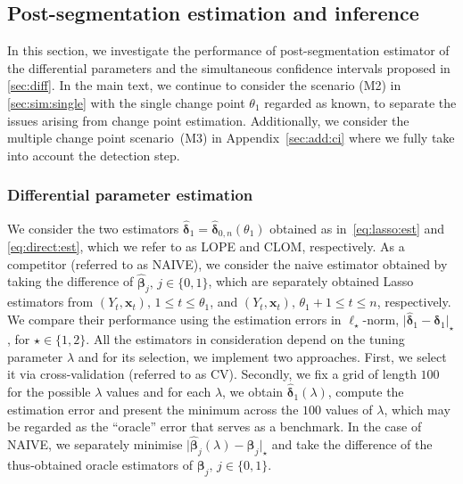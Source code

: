 \documentclass[11pt, a4paper]{article}
\newcommand{\mbf}{\mathbf}
\def\wh{\widehat}
\newcommand{\cp}{\theta}
\theoremstyle{definition}
\theoremstyle{definition}
\theoremstyle{definition}
\theoremstyle{definition}
\theoremstyle{definition}
\theoremstyle{remark}
\theoremstyle{definition}
\theoremstyle{definition}
\theoremstyle{definition}
\begin{document}
\subsection{Post-segmentation estimation and inference}
\label{sec:sim:post}

In this section, we investigate the performance of post-segmentation estimator of the differential parameters and the simultaneous confidence intervals proposed in \cref{sec:diff}.
In the main text, we continue to consider the scenario (M2) in \cref{sec:sim:single} with the single change point $\cp_1$ regarded as known, to separate the issues arising from change point estimation.
Additionally, we consider the multiple change point scenario~(M3) in Appendix~\ref{sec:add:ci} where we fully take into account the detection step.
 
\subsubsection{Differential parameter estimation}
\label{sec:sim:dpe}

We consider the two estimators $\wh{\bm\delta}_1 = \wh{\bm\delta}_{0, n}(\cp_1)$ obtained as in~\eqref{eq:lasso:est} and \eqref{eq:direct:est}, which we refer to as LOPE and CLOM, respectively.
As a competitor (referred to as NAIVE), we consider the naive estimator obtained by taking the difference of $\wh{\bm\beta}_j, \, j \in \{0, 1\}$, which are separately obtained Lasso estimators from $(Y_t, \mbf x_t), \, 1 \le t \le \cp_1$, and $(Y_t, \mbf x_t), \, \cp_1 + 1 \le t \le n$, respectively.
We compare their performance using the estimation errors in $\ell_\star$-norm, $\vert \wh{\bm\delta}_1 - \bm\delta_1 |_\star$, for $\star \in \{1, 2\}$.
All the estimators in consideration depend on the tuning parameter $\lambda$ and for its selection, we implement two approaches.
First, we select it via cross-validation (referred to as CV).
Secondly, we fix a grid of length $100$ for the possible $\lambda$ values and for each $\lambda$, we obtain $\wh{\bm\delta}_1(\lambda)$, compute the estimation error and present the minimum across the $100$ values of $\lambda$, which may be regarded as the \enquote{oracle} error that serves as a benchmark.
In the case of NAIVE, we separately minimise $\vert \wh{\bm\beta}_j(\lambda) - \bm\beta_j \vert_\star$ and take the difference of the thus-obtained oracle estimators of $\bm\beta_j, \, j \in \{0, 1\}$.
\end{document}
